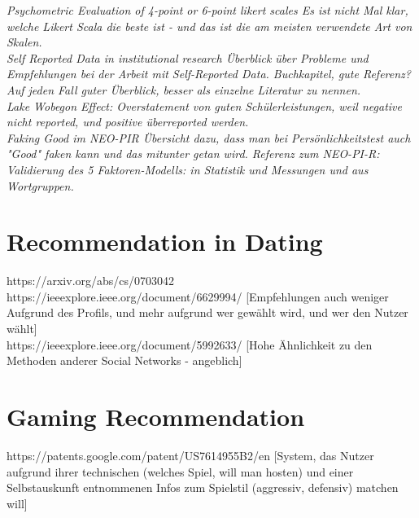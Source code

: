 \documentclass[nochapterpage,bigchapter,linedtoc,longdoc,colorback,accentcolor=tud3b,oneside]{tudreport}
\begin{document}
\textit{Psychometric Evaluation of 4-point or 6-point likert scales \cite{chang1994psychometric}
Es ist nicht Mal klar, welche Likert Scala die beste ist - und das ist die am meisten verwendete Art von Skalen.}\\

\textit{Self Reported Data in institutional research \cite{gonyea2005self}
Überblick über Probleme und Empfehlungen bei der Arbeit mit Self-Reported Data. Buchkapitel, gute Referenz? Auf jeden Fall guter Überblick, besser als einzelne Literatur zu nennen.}\\

\textit{Lake Wobegon Effect: Overstatement von guten Schülerleistungen, weil negative nicht reported, und positive überreported werden. \cite{maxwell1994lake}}\\

\textit{Faking Good im NEO-PIR \cite{griffin2004applicants}
Übersicht dazu, dass man bei Persönlichkeitstest auch "Good" faken kann und das mitunter getan wird. Referenz zum NEO-PI-R: \cite{ostendorf2004neo}}\\
\textit{Validierung des 5 Faktoren-Modells: \cite{mccrae1987validation} in Statistik und Messungen und \cite{goldberg1990alternative} aus Wortgruppen.}\\

\section{Recommendation in Dating}
https://arxiv.org/abs/cs/0703042\\

https://ieeexplore.ieee.org/document/6629994/ [Empfehlungen auch weniger Aufgrund des Profils, und mehr aufgrund wer gewählt wird, und wer den Nutzer wählt]\\

https://ieeexplore.ieee.org/document/5992633/ [Hohe Ähnlichkeit zu den Methoden anderer Social Networks - angeblich]\\

\section{Gaming Recommendation}
https://patents.google.com/patent/US7614955B2/en [System, das Nutzer aufgrund ihrer technischen (welches Spiel, will man hosten) und einer Selbstauskunft entnommenen Infos zum Spielstil (aggressiv, defensiv) matchen will]\\
\end{document}
